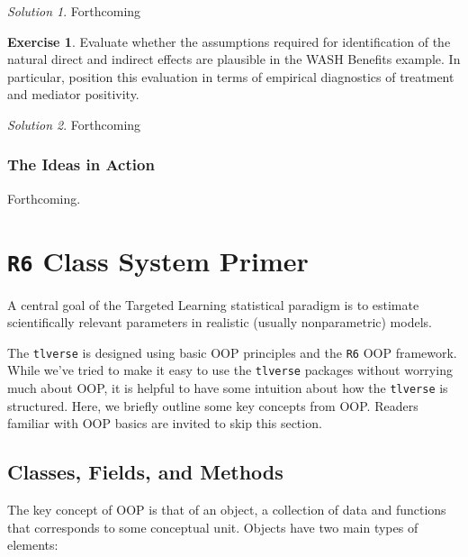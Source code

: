 \documentclass[
  12pt, krantz2,
]{krantz}
\newcommand{\passthrough}[1]{#1}
\newcommand{\1}{\mathbbm{1}}
\theoremstyle{definition}
\theoremstyle{definition}
\theoremstyle{definition}
\newtheorem{exercise}{Exercise}[chapter]
\theoremstyle{definition}
\theoremstyle{remark}
\newtheorem*{solution}{Solution}
\begin{document}
\begin{solution}
Forthcoming
\end{solution}

\begin{exercise}
Evaluate whether the assumptions required for identification of the natural
direct and indirect effects are plausible in the WASH Benefits example. In
particular, position this evaluation in terms of empirical diagnostics of
treatment and mediator positivity.
\end{exercise}

\begin{solution}
Forthcoming
\end{solution}

\hypertarget{the-ideas-in-action-2}{%
\subsection{The Ideas in Action}\label{the-ideas-in-action-2}}

Forthcoming.

\hypertarget{r6}{%
\chapter{\texorpdfstring{\texttt{R6} Class System Primer}{R6 Class System Primer}}\label{r6}}

A central goal of the Targeted Learning statistical paradigm is to estimate
scientifically relevant parameters in realistic (usually nonparametric) models.

The \passthrough{\lstinline!tlverse!} is designed using basic OOP principles and the \passthrough{\lstinline!R6!} OOP framework.
While we've tried to make it easy to use the \passthrough{\lstinline!tlverse!} packages without worrying
much about OOP, it is helpful to have some intuition about how the \passthrough{\lstinline!tlverse!} is
structured. Here, we briefly outline some key concepts from OOP. Readers
familiar with OOP basics are invited to skip this section.

\hypertarget{classes-fields-and-methods}{%
\section{Classes, Fields, and Methods}\label{classes-fields-and-methods}}

The key concept of OOP is that of an object, a collection of data and functions
that corresponds to some conceptual unit. Objects have two main types of
elements:
\end{document}
